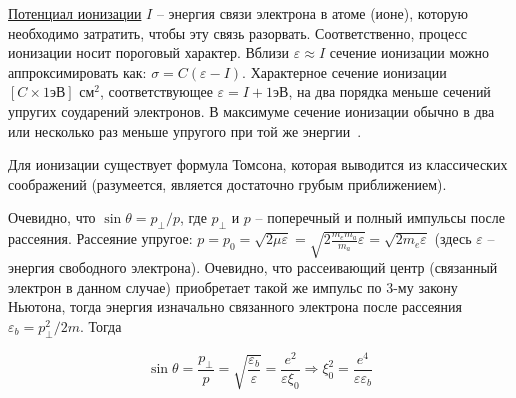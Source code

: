 \documentclass[10pt, a4paper]{article}
\begin{document}
\uline{Потенциал ионизации} $I$ -- энергия связи электрона в атоме (ионе), которую необходимо затратить, чтобы эту связь разорвать. Соответственно, процесс ионизации носит пороговый характер. Вблизи $\varepsilon \approx I$ сечение ионизации можно аппроксимировать как: $\sigma = C(\varepsilon-I)$. Характерное сечение ионизации $[C\times1 \text{эВ}]$ см$^2$, соответствующее $\varepsilon = I + 1\text{эВ}$, на два порядка
меньше сечений упругих соударений электронов. В максимуме сечение ионизации обычно в два или несколько раз меньше упругого при той же энергии~\cite{raizer}.

Для ионизации существует формула Томсона, которая выводится из классических соображений (разумеется, является достаточно грубым приближением). 

%
%
%
%

Очевидно, что $\sin\theta = p_\perp/p$, где $p_\perp$ и $p$ -- поперечный и полный импульсы после рассеяния. Рассеяние упругое: $p = p_0 = \sqrt{2\mu\varepsilon}=\sqrt{2\frac{m_em_a}{m_a}\varepsilon} = \sqrt{2m_e\varepsilon}$ (здесь $\varepsilon$ -- энергия свободного электрона). Очевидно, что рассеивающий центр (связанный электрон в данном случае) приобретает такой же импульс по 3-му закону Ньютона, тогда энергия изначально связанного электрона после рассеяния $\varepsilon_b=p_\perp^2/2m$. Тогда

\begin{equation*}
	\sin\theta = \frac{p_\perp}{p} = \sqrt{\frac{\varepsilon_b}{\varepsilon}} = 
	\frac{e^2}{\varepsilon\xi_0}\Rightarrow 
	\xi_0^2 = \frac{e^4}{\varepsilon \varepsilon_b}
\end{equation*}
\end{document}
